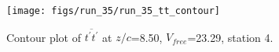 \begin{figure}[H]
\centering
\texttt{[image: figs/run\_35/run\_35\_tt\_contour]}
\caption{Contour plot of $\overline{t^\prime t^\prime}$ at $z/c$=8.50, $V_{free}$=23.29, station 4.}
\label{fig:run_35_tt_contour}
\end{figure}


